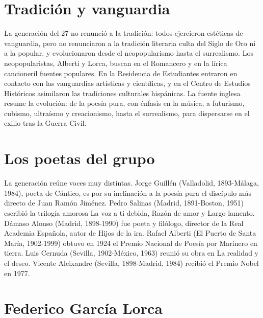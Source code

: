 \documentclass{book}
\begin{document}

\section{Tradición y vanguardia}

La generación del 27 no renunció a la tradición: todos ejercieron estéticas de vanguardia, pero no renunciaron a la tradición literaria culta del Siglo de Oro ni a la popular, y evolucionaron desde el neopopularismo hasta el surrealismo. Los neopopularistas, Alberti y Lorca, buscan en el Romancero y en la lírica cancioneril fuentes populares. En la Residencia de Estudiantes entraron en contacto con las vanguardias artísticas y científicas, y en el Centro de Estudios Históricos asimilaron las tradiciones culturales hispánicas. La fuente inglesa resume la evolución: de la poesía pura, con énfasis en la música, a futurismo, cubismo, ultraísmo y creacionismo, hasta el surrealismo, para dispersarse en el exilio tras la Guerra Civil.


\section{Los poetas del grupo}

La generación reúne voces muy distintas. Jorge Guillén (Valladolid, 1893-Málaga, 1984), poeta de Cántico, es por su inclinación a la poesía pura el discípulo más directo de Juan Ramón Jiménez. Pedro Salinas (Madrid, 1891-Boston, 1951) escribió la trilogía amorosa La voz a ti debida, Razón de amor y Largo lamento. Dámaso Alonso (Madrid, 1898-1990) fue poeta y filólogo, director de la Real Academia Española, autor de Hijos de la ira. Rafael Alberti (El Puerto de Santa María, 1902-1999) obtuvo en 1924 el Premio Nacional de Poesía por Marinero en tierra. Luis Cernuda (Sevilla, 1902-México, 1963) reunió su obra en La realidad y el deseo. Vicente Aleixandre (Sevilla, 1898-Madrid, 1984) recibió el Premio Nobel en 1977.


\section{Federico García Lorca}
\end{document}
